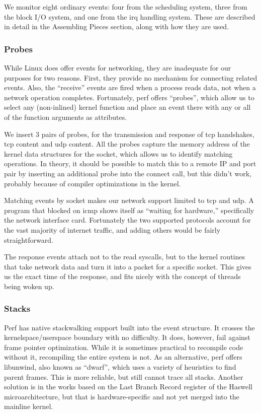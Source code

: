 \documentclass[10pt]{article}
\begin{document}
We monitor eight ordinary events: four from the sched\-uling system, three from the block I/O system, and one from the irq handling system.  These are described in detail in the Assembling Pieces section, along with how they are used.

\subsubsection{Probes}

While Linux does offer events for networking, they are inadequate for our purposes for two reasons.  First, they provide no mechanism for connecting related events.  Also, the ``receive'' events are fired when a process reads data, not when a network operation completes.  Fortunately, perf offers ``probes'', which allow us to select any (non-inlined) kernel function and place an event there with any or all of the function arguments as attributes.

We insert 3 pairs of probes, for the transmission and response of tcp handshakes, tcp content and udp content.  All the probes capture the memory address of the kernel data structures for the socket, which allows us to identify matching operations.  In theory, it should be possible to match this to a remote IP and port pair by inserting an additional probe into the connect call, but this didn't work, probably because of compiler optimizations in the kernel.  

Matching events by socket makes our network support limited to tcp and udp.  A program that blocked on icmp shows itself as ``waiting for hardware,'' specifically the network interface card.  Fortunately the two supported protocols account for the vast majority of internet traffic, and adding others would be fairly straightforward.

The response events attach not to the read syscalls, but to the kernel routines that take network data and turn it into a packet for a specific socket.  This gives us the exact time of the response, and fits nicely with the concept of threads being woken up.

\subsubsection{Stacks}

Perf has native stackwalking support built into the event structure.  It crosses the kernelspace/userspace boundary with no difficulty.  It does, however, fail against frame pointer optimization.  While it is sometimes practical to recompile code without it, recompiling the entire system is not.  As an alternative, perf offers libunwind, also known as ``dwarf'', which uses a variety of heuristics to find parent frames.  This is more reliable, but still cannot trace all stacks.  Another solution is in the works based on the Last Branch Record register of the Haswell microarchitecture, but that is hardware-specific and not yet merged into the mainline kernel.
\end{document}
